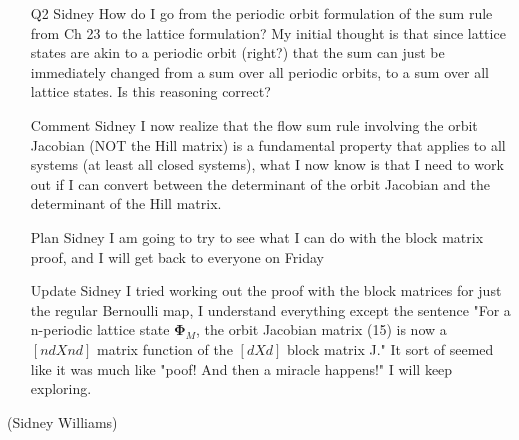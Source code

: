 {\begin{itemize}
\item[Q2 Sidney]
How do I go from the periodic orbit formulation of the sum rule from Ch 23 to the lattice formulation? My initial thought is that since lattice states are akin to a periodic orbit (right?) that the sum can just be immediately changed from a sum over all periodic orbits, to a sum over all lattice states. Is this reasoning correct? 

\item[Comment Sidney]
I now realize that the flow sum rule involving the orbit Jacobian (NOT the Hill matrix) is a fundamental property that applies to all systems (at least all closed systems), what I now know is that I need to work out if I can convert between the determinant of the orbit Jacobian and the determinant of the Hill matrix. 

\item[Plan Sidney]
I am going to try to see what I can do with the block matrix proof, and I will get back to everyone on Friday

\item[Update Sidney]
I tried working out the proof with the block matrices for just the regular Bernoulli map, I understand everything except the sentence "For a n-periodic lattice state $\mathbf{\Phi}_M$, the orbit Jacobian matrix (15) is now a $[ndXnd]$ matrix function of the $[dXd]$ block matrix J." It sort of seemed like it was much like "poof! And then a miracle happens!" I will keep exploring.
\end{itemize}
\hfill (Sidney Williams) %
    } %

